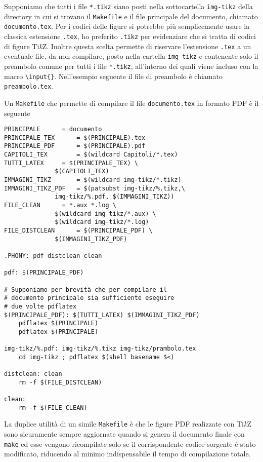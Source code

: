 Supponiamo che tutti i file \texttt{*.tikz} siano posti nella sottocartella
\texttt{img-tikz} della directory in cui si trovano il \texttt{Makefile} e il
file principale del documento, chiamato \texttt{documento.tex}. Per i codici
delle figure si potrebbe più semplicemente usare la classica estensione
\texttt{.tex}, ho preferito \texttt{.tikz} per evidenziare che si tratta di
codici di figure Ti\emph{k}Z.  Inoltre questa scelta permette di riservare
l'estensione \texttt{.tex} a un eventuale file, da non compilare, posto nella
cartella \texttt{img-tikz} e contenente solo il preambolo comune per tutti i
file \texttt{*.tikz}, all'interno dei quali viene incluso con la macro
\texttt{\textbackslash{}input\{\}}.  Nell'esempio seguente il file di preambolo
è chiamato \texttt{preambolo.tex}.

Un \texttt{Makefile} che permette di compilare il file \texttt{documento.tex} in
formato \textsc{PDF} è il seguente
\begin{lstlisting}
PRINCIPALE 	    = documento
PRINCIPALE_TEX	    = $(PRINCIPALE).tex
PRINCIPALE_PDF	    = $(PRINCIPALE).pdf
CAPITOLI_TEX	    = $(wildcard Capitoli/*.tex)
TUTTI_LATEX	    = $(PRINCIPALE_TEX) \
		      $(CAPITOLI_TEX)
IMMAGINI_TIKZ	    = $(wildcard img-tikz/*.tikz)
IMMAGINI_TIKZ_PDF   = $(patsubst img-tikz/%.tikz,\
		      img-tikz/%.pdf, $(IMMAGINI_TIKZ))
FILE_CLEAN	    = *.aux *.log \
		      $(wildcard img-tikz/*.aux) \
		      $(wildcard img-tikz/*.log)
FILE_DISTCLEAN	    = $(PRINCIPALE_PDF) \
		      $(IMMAGINI_TIKZ_PDF)

.PHONY: pdf distclean clean

pdf: $(PRINCIPALE_PDF)

# Supponiamo per brevità che per compilare il
# documento principale sia sufficiente eseguire
# due volte pdflatex
$(PRINCIPALE_PDF): $(TUTTI_LATEX) $(IMMAGINI_TIKZ_PDF)
	pdflatex $(PRINCIPALE)
	pdflatex $(PRINCIPALE)

img-tikz/%.pdf: img-tikz/%.tikz img-tikz/prambolo.tex
	cd img-tikz ; pdflatex $(shell basename $<)

distclean: clean
	rm -f $(FILE_DISTCLEAN)

clean:
	rm -f $(FILE_CLEAN)
\end{lstlisting}
La duplice utilità di un simile \texttt{Makefile} è che le figure \textsc{PDF}
realizzate con Ti\emph{k}Z sono sicuramente sempre aggiornate quando si genera
il documento finale con \texttt{make} ed esse vengono ricompilate solo se il
corrispondente codice sorgente è stato modificato, riducendo al minimo
indispensabile il tempo di compilazione totale.

